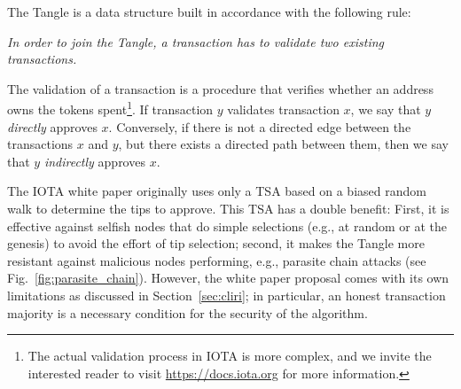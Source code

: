 \documentclass[../main.tex]{subfiles}
\begin{document}
The Tangle is a data structure built in accordance with the following rule:

\begin{displayquote}
    \textit{In order to join the Tangle, a transaction has to validate two existing transactions.}
\end{displayquote}

\noindent
The validation of a transaction is a procedure that verifies whether an address owns the tokens spent\footnote{The actual validation process in IOTA is more complex, and we invite the interested reader to visit \url{https://docs.iota.org} for more information.}. If transaction $y$ validates transaction $x$, we say that $y$ \textit{directly} approves $x$. Conversely, if there is not a directed edge between the transactions $x$ and $y$, but there exists a directed path between them, then we say that $y$ \textit{indirectly} approves $x$.

The IOTA white paper originally uses only a TSA based on a biased random walk to determine the tips to approve. This TSA has a double benefit: First, it is effective against selfish nodes that do simple selections (e.g., at random or at the genesis) to avoid the effort of tip selection; second, it makes the Tangle more resistant against malicious nodes performing, e.g., parasite chain attacks (see Fig.~\ref{fig:parasite_chain}). However, the white paper proposal comes with its own limitations as discussed in Section~\ref{sec:cliri}; in particular, an honest transaction majority is a necessary condition for the security of the algorithm.
\end{document}
